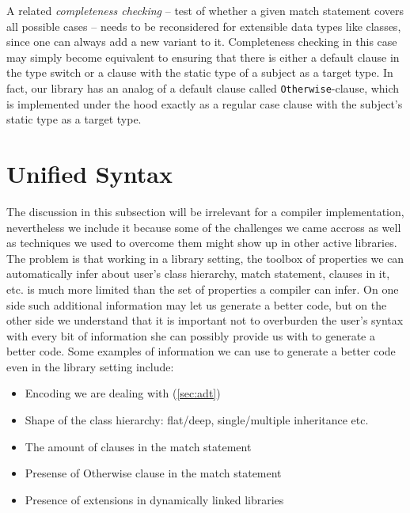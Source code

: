 \documentclass[preprint]{sigplanconf}
\makeatletter
\DeclareRobustCommand{\code}[1]{{\lstinline[breaklines=false,escapechar=@]{#1}}}
\makeatother
\begin{document}
A related \emph{completeness checking} -- test of whether a given match 
statement covers all possible cases -- needs to be reconsidered for extensible 
data types like classes, since one can always add a new variant to it. 
Completeness checking in this case may simply become equivalent to ensuring that 
there is either a default clause in the type switch or a clause with the static type 
of a subject as a target type. In fact, our library has an analog of a default 
clause called \code{Otherwise}-clause, which is implemented under the hood 
exactly as a regular case clause with the subject's static type as a target type.

\section{Unified Syntax}
\label{sec:unisyn}

The discussion in this subsection will be irrelevant for a compiler 
implementation, nevertheless we include it because some of the challenges we 
came accross as well as techniques we used to overcome them might show up in 
other active libraries. The problem is that working in a library setting, the 
toolbox of properties we can automatically infer about user's class hierarchy, 
match statement, clauses in it, etc. is much more limited than the set of 
properties a compiler can infer. On one side such additional information may let 
us generate a better code, but on the other side we understand that it is 
important not to overburden the user's syntax with every bit of information she 
can possibly provide us with to generate a better code. Some examples of 
information we can use to generate a better code even in the library setting 
include:

\begin{itemize}
\setlength{\itemsep}{0pt}
\setlength{\parskip}{0pt}
\item Encoding we are dealing with (\textsection\ref{sec:adt})
\item Shape of the class hierarchy: flat/deep, single/multiple inheritance etc.
\item The amount of clauses in the match statement
\item Presense of Otherwise clause in the match statement
\item Presence of extensions in dynamically linked libraries
\end{itemize}
\end{document}
